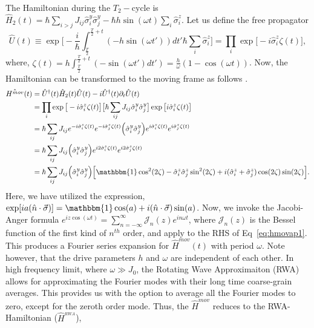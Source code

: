 \documentclass[%
nofootinbib,
reprint,
superscriptaddress,
amsmath,amssymb,showkeys,
aps,
prb,
]{revtex4-2}
\begin{document}
	The Hamiltonian during the $T_2-$cycle is $\displaystyle \hat{H}_2(t) = \hbar\sum_{i>j} J_{ij}\hat{\sigma}^y_i\hat{\sigma}^y_j - \hbar h \sin(\omega t) \sum_i \hat{\sigma}^z_i$. Let us define the free propagator 
	\begin{equation}
		\hat{U}(t) \equiv \exp \bigg[-\frac{i}{\hbar}\int_{\frac{T}{2}}^{\frac{T}{2}+t} (-h \sin(\omega t'))dt' \hbar\sum_i\hat{\sigma}^z_i\bigg]
		=\prod_{i} \exp\big[-i \hat{\sigma}^z_i\zeta(t)\big],
	\end{equation}
	where, $\displaystyle \zeta (t) = h\int_{\frac{T}{2}}^{\frac{T}{2}+t}  (-\sin(\omega t')dt') =\frac{h}{\omega}(1-\cos(\omega t))$.
	Now, the Hamiltonian can be transformed to the moving frame as follows \cite{haldar_statistical_2022}.
	\begin{align}
		\hat{H^{mov}}(t) &= \hat{U}^\dagger(t) \hat{H}_2(t) \hat{U}(t)- i \hat{U}^\dagger(t) \partial_t \hat{U}(t) \nonumber\\
		&= \prod_{i} \exp\big[-i\hat{\sigma}^z_i \zeta(t)\big] \big[\hbar\sum_{ij}J_{ij}\hat{\sigma}^y_i\hat{\sigma}^y_j\big] \exp\big[ i\hat{\sigma}^z_i \zeta(t)\big]\nonumber\\
		&= \hbar\sum_{ij} J_{ij} e^{-i\hat{\sigma}^z_i \zeta(t)} e^{-i\hat{\sigma}^z_j  \zeta(t)}\Big(\hat{\sigma}^y_i\hat{\sigma}^y_j\Big)e^{i\hat{\sigma}^z_i \zeta(t)} e^{i\hat{\sigma}^z_j \zeta(t)}\nonumber\\
		&= \hbar\sum_{ij} J_{ij} \Big(\hat{\sigma}^y_i\hat{\sigma}^y_j\Big)e^{i2\hat{\sigma}^z_i \zeta(t)} e^{i2\hat{\sigma}^z_j \zeta(t)}\nonumber\\
		&= \hbar\sum_{ij} J_{ij} \Big(\hat{\sigma}^y_i\hat{\sigma}^y_j\Big) \Big[\mathbbm{1}\cos^2(2\zeta) -\hat{\sigma}^z_i\hat{\sigma}^z_j \sin^2(2\zeta) + i (\hat{\sigma}^z_i + \hat{\sigma}^z_j)\cos(2\zeta)\sin(2\zeta)\Big].
		\label{eq:hmovap1}
	\end{align}
	Here, we have utilized the expression, $\displaystyle \exp[ia(\hat{n}\cdot\vec{\sigma})] = \mathbbm{1} \cos(a) + i (\hat{n}\cdot\vec{\sigma})\sin(a)$.	Now, we invoke the Jacobi-Anger formula $\displaystyle e^{iz\cos(\omega t)} = \sum_{n=-\infty}^{\infty}\mathcal{J}_n(z)e^{in\omega t}$\cite{arfkenmath}, where $\mathcal{J}_n(z)$ is the Bessel function of the first kind of $n^{th}$ order, and apply to the RHS of  Eq~\ref{eq:hmovap1}. This produces a Fourier series expansion for 
	 $\hat{H}^{mov}(t)$ with period $\omega$. Note however, that the drive parameters $h$ and $\omega$ are independent of each other. In high frequency limit, where $\omega \gg J_0$, the Rotating Wave Approximaiton (RWA) allows for approximating the Fourier modes with their long time coarse-grain averages. This provides us with the option to average all the Fourier modes to zero, except for the zeroth order mode. Thus, the $\hat{H}^{mov}$ reduces to the RWA-Hamiltonian ($\hat{H}^{_{RWA}}$),
\end{document}
